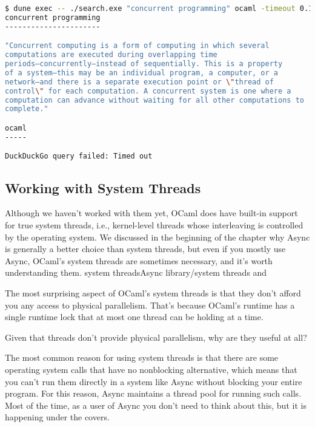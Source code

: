 \begin{lstlisting}[language=bash]
$ dune exec -- ./search.exe "concurrent programming" ocaml -timeout 0.1s
concurrent programming
----------------------

"Concurrent computing is a form of computing in which several
computations are executed during overlapping time
periods—concurrently—instead of sequentially. This is a property
of a system—this may be an individual program, a computer, or a
network—and there is a separate execution point or \"thread of
control\" for each computation. A concurrent system is one where a
computation can advance without waiting for all other computations to
complete."

ocaml
-----

DuckDuckGo query failed: Timed out
\end{lstlisting}

\hypertarget{working-with-system-threads}{%
\subsection{Working with System
Threads}\label{working-with-system-threads}}

Although we haven't worked with them yet, OCaml does have built-in
support for true system threads, i.e., kernel-level threads whose
interleaving is controlled by the operating system. We discussed in the
beginning of the chapter why Async is generally a better choice than
system threads, but even if you mostly use Async, OCaml's system threads
are sometimes necessary, and it's worth understanding them.
\protect\hypertarget{systhrd}{}{system
threads}\protect\hypertarget{ALsysthr}{}{Async library/system threads
and}

The most surprising aspect of OCaml's system threads is that they don't
afford you any access to physical parallelism. That's because OCaml's
runtime has a single runtime lock that at most one thread can be holding
at a time.

Given that threads don't provide physical parallelism, why are they
useful at all?

The most common reason for using system threads is that there are some
operating system calls that have no nonblocking alternative, which means
that you can't run them directly in a system like Async without blocking
your entire program. For this reason, Async maintains a thread pool for
running such calls. Most of the time, as a user of Async you don't need
to think about this, but it is happening under the covers.

